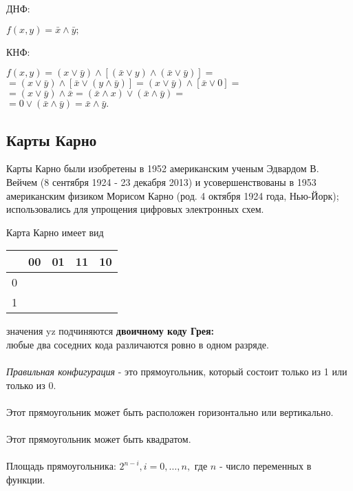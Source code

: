 \documentclass{article}
\begin{document}
	ДНФ:
	\begin{center}
	$f(x, y) = \bar{x} \wedge \bar{y};$
	\end{center}
	
	КНФ:
	\begin{center}
	$f(x, y) = (x \vee \bar{y}) \wedge [(\bar{x} \vee y) \wedge (\bar{x} \vee \bar{y})] =$\\
	$= (x \vee \bar{y}) \wedge [\bar{x} \vee (y \wedge \bar{y})] = (x \vee \bar{y}) \wedge [\bar{x} \vee 0] =$\\
	$= (x \vee \bar{y}) \wedge \bar{x} = (\bar{x} \wedge x) \vee (\bar{x} \wedge \bar{y}) =$\\
	$= 0 \vee (\bar{x} \wedge \bar{y}) = \bar{x} \wedge \bar{y}.$
	\end{center}

	\begin{center}
	\subsection*{Карты Карно}
	Карты Карно были изобретены в 1952 американским ученым Эдвардом В. Вейчем (8 сентября 1924 - 23 декабря 2013) и
	усовершенствованы в 1953 американским физиком Морисом Карно (род. 4 октября 1924 года, Нью-Йорк); использовались
	для упрощения цифровых электронных схем.
	\end{center}
	
	Карта Карно имеет вид
	
	\begin{table}[ht]
		\centering
		\begin{tabular}{|l|l|l|l|l|}
			\hline
			\diagbox{x}{yz} & 00 & 01 & 11 & 10 \\ \hline
			0    &    &    &    &    \\ \hline
			1    &    &    &    &    \\ \hline
		\end{tabular}
	\end{table}
	
	значения yz подчиняются \textbf{двоичному коду Грея:}\\
	любые два соседних кода различаются ровно в одном разряде.\\\\
	\textit{Правильная конфигурация} - это прямоугольник, который состоит только из 1 или только из 0.\\\\
	Этот прямоугольник может быть расположен горизонтально или вертикально.\\\\
	Этот прямоугольник может быть квадратом.\\\\
	Площадь прямоугольника: $2^{n-i}, i = 0, \dots, n,$ где $n$ - число переменных в функции.
	
\end{document}

